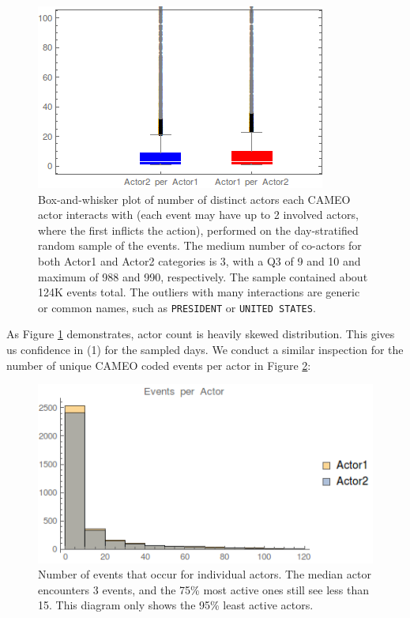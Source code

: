 \begin{figure}[ht]
\vskip 0.2in
\begin{center}
\centerline{\includegraphics[width=\columnwidth]{images/actors-per-actor.png}}
\caption{Box-and-whisker plot of number of distinct actors each CAMEO actor interacts with (each event may have up to 2 involved actors, where the first inflicts the action), performed on the day-stratified random sample of the events. The medium number of co-actors for both Actor1 and Actor2 categories is 3, with a Q3 of 9 and 10 and maximum of 988 and 990, respectively. The sample contained about 124K events total. The outliers with many interactions are generic or common names, such as \texttt{PRESIDENT} or \texttt{UNITED STATES}.
}
\end{center}
\vskip -0.2in
\label{fig:actors-per-actor}
\end{figure} 

As Figure \ref{fig:actors-per-actor} demonstrates, actor count is heavily skewed distribution. This gives us confidence in (1) for the sampled days. We conduct a similar inspection for the number of unique CAMEO coded events per actor in Figure \ref{fig:events-per-actor}:

\begin{figure}[ht]
\vskip 0.2in
\begin{center}
\centerline{\includegraphics[width=\columnwidth]{images/events-per-actor}}
\caption{Number of events that occur for individual actors. The median actor encounters 3 events, and the 75\% most active ones still see less than 15. This diagram only shows the 95\% least active actors.}
\end{center}
\vskip -0.2in
\label{fig:events-per-actor}
\end{figure} 

